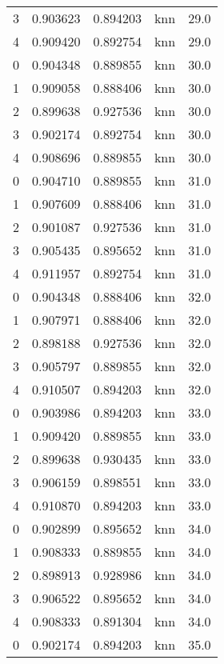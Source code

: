 \begin{tabular}{rrrlr}
     3 & 0.903623 & 0.894203 &      knn &       29.0 \\
     4 & 0.909420 & 0.892754 &      knn &       29.0 \\
     0 & 0.904348 & 0.889855 &      knn &       30.0 \\
     1 & 0.909058 & 0.888406 &      knn &       30.0 \\
     2 & 0.899638 & 0.927536 &      knn &       30.0 \\
     3 & 0.902174 & 0.892754 &      knn &       30.0 \\
     4 & 0.908696 & 0.889855 &      knn &       30.0 \\
     0 & 0.904710 & 0.889855 &      knn &       31.0 \\
     1 & 0.907609 & 0.888406 &      knn &       31.0 \\
     2 & 0.901087 & 0.927536 &      knn &       31.0 \\
     3 & 0.905435 & 0.895652 &      knn &       31.0 \\
     4 & 0.911957 & 0.892754 &      knn &       31.0 \\
     0 & 0.904348 & 0.888406 &      knn &       32.0 \\
     1 & 0.907971 & 0.888406 &      knn &       32.0 \\
     2 & 0.898188 & 0.927536 &      knn &       32.0 \\
     3 & 0.905797 & 0.889855 &      knn &       32.0 \\
     4 & 0.910507 & 0.894203 &      knn &       32.0 \\
     0 & 0.903986 & 0.894203 &      knn &       33.0 \\
     1 & 0.909420 & 0.889855 &      knn &       33.0 \\
     2 & 0.899638 & 0.930435 &      knn &       33.0 \\
     3 & 0.906159 & 0.898551 &      knn &       33.0 \\
     4 & 0.910870 & 0.894203 &      knn &       33.0 \\
     0 & 0.902899 & 0.895652 &      knn &       34.0 \\
     1 & 0.908333 & 0.889855 &      knn &       34.0 \\
     2 & 0.898913 & 0.928986 &      knn &       34.0 \\
     3 & 0.906522 & 0.895652 &      knn &       34.0 \\
     4 & 0.908333 & 0.891304 &      knn &       34.0 \\
     0 & 0.902174 & 0.894203 &      knn &       35.0 \\

\end{tabular}
